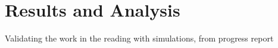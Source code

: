 \chapter{Results and Analysis} \label{Chapter:five}
Validating the work in the reading with simulations, from progress report